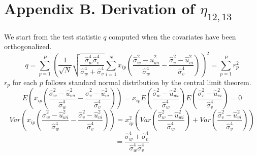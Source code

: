\documentclass[aap,authoryear, preprint]{imsart}
\numberwithin{equation}{section}
\theoremstyle{plain}
\begin{document}
\section*{Appendix B. Derivation of $\eta_{12,13}$}
We start from the test statistic $q$ computed when the covariates have been orthogonalized.
$$q = \sum_{p=1}^{P}
 \left(\frac{1}{\sqrt{N}}
 \sqrt{\frac{\hat{\sigma}_w^4 \hat{\sigma}_v^4}{\hat{\sigma}_w^4 + \hat{\sigma}_v^4}}
 \sum_{i=1}^{N} x_{ip} \left( \frac{\hat{\sigma}_w^2 - \hat{u}_{wi}^2}{\hat{\sigma}_w^4}
 - \frac{\hat{\sigma}_v^2 - \hat{u}_{vi}^2}{\hat{\sigma}_v^4}
 \right)
\right)^2 = \sum_{p=1}^{P}r_p^2$$
$r_p$ for each $p$ follows standard normal distribution by the central limit theorem. 
$$E\left(x_{ip}\left( \frac{\hat{\sigma}_w^2 - \hat{u}_{wi}^2}{\hat{\sigma}_w^4}
 - \frac{\hat{\sigma}_v^2 - \hat{u}_{vi}^2}{\hat{\sigma}_v^4}
 \right)\right) = x_{ip} E\left( \frac{\hat{\sigma}_w^2 - \hat{u}_{wi}^2}{\hat{\sigma}_w^4} \right) E\left( \frac{\hat{\sigma}_v^2 - \hat{u}_{vi}^2}{\hat{\sigma}_v^4}
 \right) = 0$$
$$Var\left(x_{ip}\left( \frac{\hat{\sigma}_w^2 - \hat{u}_{wi}^2}{\hat{\sigma}_w^4}
- \frac{\hat{\sigma}_v^2 - \hat{u}_{vi}^2}{\hat{\sigma}_v^4}
\right)\right) = 
x_{ip}^2 \left( Var\left( \frac{\hat{\sigma}_w^2 - \hat{u}_{wi}^2}{\hat{\sigma}_w^4} \right)  + Var\left( \frac{\hat{\sigma}_v^2 - \hat{u}_{vi}^2}{\hat{\sigma}_v^4}\right)\right)$$
 $$ = \frac{\hat{\sigma}_w^4 + \hat{\sigma}_v^4}{\hat{\sigma}_w^4 \hat{\sigma}_v^4}$$
\end{document}

